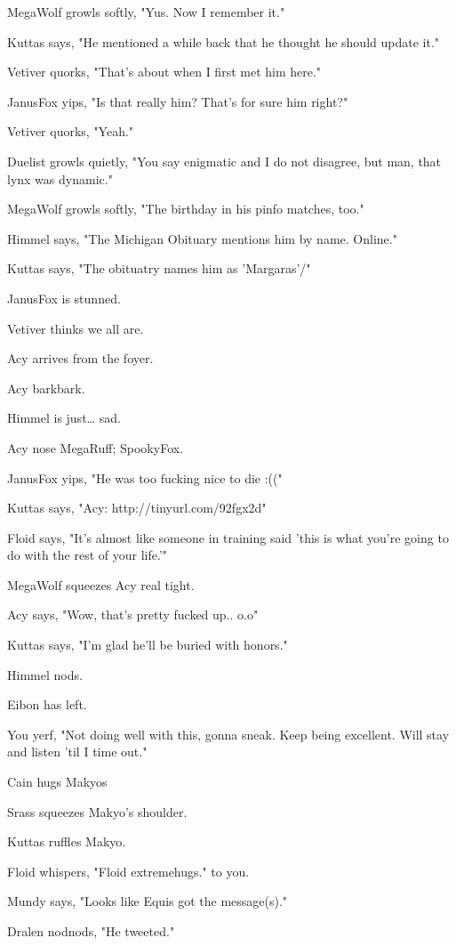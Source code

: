 MegaWolf growls softly, "Yus. Now I remember it."

Kuttas says, "He mentioned a while back that he thought he should update it."

Vetiver quorks, "That's about when I first met him here."

JanusFox yips, "Is that really him?  That's for sure him right?"

Vetiver quorks, "Yeah."

Duelist growls quietly, "You say enigmatic and I do not disagree, but man, that lynx was dynamic."

MegaWolf growls softly, "The birthday in his pinfo matches, too."

Himmel says, "The Michigan Obituary mentions him by name. Online."

Kuttas says, "The obituatry names him as 'Margaras'/"

JanusFox is stunned.

Vetiver thinks we all are.

Acy arrives from the foyer.

Acy barkbark.

Himmel is just\ldots{} sad.

Acy nose MegaRuff; SpookyFox.

JanusFox yips, "He was too fucking nice to die :(("

Kuttas says, "Acy: http://tinyurl.com/92fgx2d"

Floid says, "It's almost like someone in training said 'this is what you're going to do with the rest of your life.'"

MegaWolf squeezes Acy real tight.

Acy says, "Wow, that's pretty fucked up.. o.o"

Kuttas says, "I'm glad he'll be buried with honors."

Himmel nods.

Eibon has left.

You yerf, "Not doing well with this, gonna sneak.  Keep being excellent.  Will stay and listen 'til I time out."

Cain hugs Makyos

Srass squeezes Makyo's shoulder.

Kuttas ruffles Makyo.

Floid whispers, "Floid extremehugs." to you.

Mundy says, "Looks like Equis got the message(s)."

Dralen nodnods, "He tweeted."

